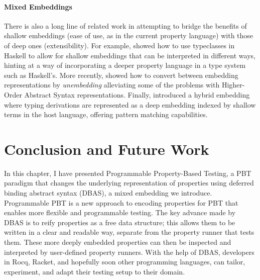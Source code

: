 \paragraph{Mixed Embeddings}
There is also a long line of related work in attempting to bridge the benefits of
shallow embeddings (ease of use, as in the current property language) with those of
deep ones (extensibility). For example, \citet{CARETTE_KISELYOV_SHAN_2009} showed how
to use typeclasses in Haskell to allow for shallow embeddings that can be interpreted
in different ways, hinting at a way of incorporating a deeper property language in a
type system such as Haskell's. More recently, \citet{Unembedding} showed how to convert
between embedding representations by {\em unembedding} alleviating some of the problems
with Higher-Order Abstract Syntax representations. Finally,
\citet{DeeperShallowEmbeddings} introduced a hybrid embedding where typing derivations
are represented as a deep embedding indexed by shallow terms in the host language,
offering pattern matching capabilities.


\section{Conclusion and Future Work}\label{sec:future}
In this chapter, I have presented Programmable Property-Based Testing, a PBT paradigm
that changes the underlying representation of properties using deferred binding
abstract syntax (DBAS), a mixed embedding we introduce. Programmable PBT is a new
approach to encoding properties for PBT that enables more flexible and programmable
testing. The key advance made by DBAS is to reify properties as a free data structure;
this allows them to be written in a clear and readable way, separate from the property
runner that tests them. These more deeply embedded properties can then be inspected and
interpreted by user-defined property runners. With the help of DBAS, developers in
Rocq, Racket, and hopefully soon other programming languages, can tailor, experiment,
and adapt their testing setup to their domain.


